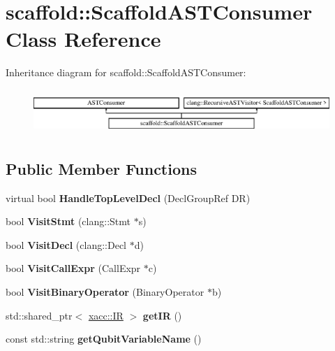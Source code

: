 \hypertarget{a00259}{}\section{scaffold\+:\+:Scaffold\+A\+S\+T\+Consumer Class Reference}
\label{a00259}
Inheritance diagram for scaffold\+:\+:Scaffold\+A\+S\+T\+Consumer\+:\begin{figure}[H]
\begin{center}
\leavevmode
\includegraphics[height=1.717791cm]{a00259}
\end{center}
\end{figure}
\subsection*{Public Member Functions}
\begin{DoxyCompactItemize}
\item 
virtual bool {\bfseries Handle\+Top\+Level\+Decl} (Decl\+Group\+Ref DR)\hypertarget{a00259_a14020b09423a4efb0f992ace1d482a57}{}\label{a00259_a14020b09423a4efb0f992ace1d482a57}

\item 
bool {\bfseries Visit\+Stmt} (clang\+::\+Stmt $\ast$s)\hypertarget{a00259_a3269dcedd2f3175837a94acbf74901d1}{}\label{a00259_a3269dcedd2f3175837a94acbf74901d1}

\item 
bool {\bfseries Visit\+Decl} (clang\+::\+Decl $\ast$d)\hypertarget{a00259_aa1c7cd8940ee725b88cc84256d19f555}{}\label{a00259_aa1c7cd8940ee725b88cc84256d19f555}

\item 
bool {\bfseries Visit\+Call\+Expr} (Call\+Expr $\ast$c)\hypertarget{a00259_a91844fe528e854e205429f3b5d2b0e47}{}\label{a00259_a91844fe528e854e205429f3b5d2b0e47}

\item 
bool {\bfseries Visit\+Binary\+Operator} (Binary\+Operator $\ast$b)\hypertarget{a00259_a598a634d96ffb4217bb0938720e669d2}{}\label{a00259_a598a634d96ffb4217bb0938720e669d2}

\item 
std\+::shared\+\_\+ptr$<$ \hyperlink{a00167}{xacc\+::\+IR} $>$ {\bfseries get\+IR} ()\hypertarget{a00259_a92d059cda85ffeafc8a35ed50a8d5f17}{}\label{a00259_a92d059cda85ffeafc8a35ed50a8d5f17}

\item 
const std\+::string {\bfseries get\+Qubit\+Variable\+Name} ()\hypertarget{a00259_ab1d779aee8690e77e7c9a89f93c41a1f}{}\label{a00259_ab1d779aee8690e77e7c9a89f93c41a1f}

\end{DoxyCompactItemize}
